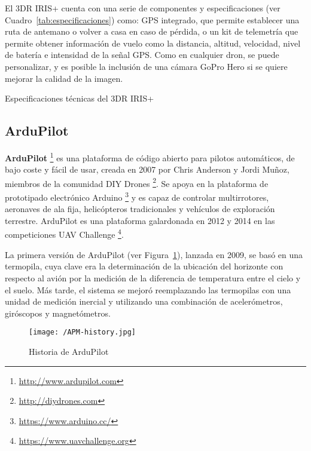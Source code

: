El 3DR IRIS+ cuenta con una serie de componentes y especificaciones (ver Cuadro~\ref{tab:especificaciones}) como: GPS integrado, que permite establecer una ruta de antemano o volver a casa en caso de pérdida, o un kit de telemetría que permite obtener información de vuelo como la distancia, altitud, velocidad, nivel de batería e intensidad de la señal \acs{GPS}. Como en cualquier dron, se puede personalizar, y es posible la inclusión de una cámara GoPro Hero si se quiere mejorar la calidad de la imagen.

\begin{table}[htbp]
  \centering
  {\small
  
  }
  \caption[Especificaciones técnicas del 3DR IRIS+]
  {Especificaciones técnicas del 3DR IRIS+ \cite{especifaciones3dr}}
  \label{tab:especificaciones}
\end{table}

\subsection{ArduPilot}
\label{sec:ardupilot}

\textbf{ArduPilot} \footnote{\url{http://www.ardupilot.com}} es una plataforma de código abierto para pilotos automáticos, de bajo coste y fácil de usar, creada en 2007 por Chris Anderson y Jordi Muñoz, miembros de la comunidad DIY Drones \footnote{\url{http://diydrones.com}}. Se apoya en la plataforma de prototipado electrónico Arduino \footnote{\url{https://www.arduino.cc/}} y es capaz de controlar multirrotores, aeronaves de ala fija, helicópteros tradicionales y vehículos de exploración terrestre. ArduPilot es una plataforma galardonada en 2012 y 2014 en las competiciones UAV Challenge \footnote{\url{https://www.uavchallenge.org}}.

La primera versión de ArduPilot (ver Figura~\ref{fig:APMHistory}), lanzada en 2009, se basó en una termopila, cuya clave era la determinación de la ubicación del horizonte con respecto al avión por la medición de la diferencia de temperatura entre el cielo y el suelo. Más tarde, el sistema se mejoró reemplazando las termopilas con una unidad de medición inercial y utilizando una combinación de acelerómetros, giróscopos y magnetómetros.

\begin{figure}[!h]
\begin{center}
\texttt{[image: /APM-history.jpg]}
\caption[Historia de ArduPilot]{Historia de ArduPilot \footnotemark}
\label{fig:APMHistory}
\end{center}
\end{figure}

